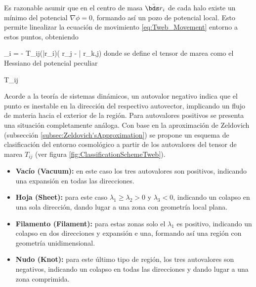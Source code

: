 Es razonable asumir que en el centro de masa $\bar{\bds r}_i$ de cada halo
existe un mínimo del potencial $\nabla \phi = 0$, formando así un pozo de 
potencial local. Esto permite linea\-lizar la ecuación de movimiento 
\ref{eq:Tweb_Movement} entorno a estos puntos, obteniendo


{ _i = - T_{ij}(\bar{\bds r}_i)( r_j - \bar{ r}_{k,j})}
donde se define el tensor de marea como el Hessiano del potencial peculiar


{ T_{ij} \equiv {}}


Acorde a la teoría de sistemas dinámicos, un autovalor negativo indica que
el punto es inestable en la dirección del respectivo autovector, implicando 
un flujo de materia hacia el exterior de la región. Para autovalores 
positivos se presenta una situación completamente análoga. Con base en la 
aproximación de Zeldovich (subsección \ref{subsec:Zeldovich'sApproximation})
se propone un esquema de clasificación del entorno cosmológico a partir de 
los autovalores del tensor de marea $T_{ij}$ 
(ver figura \ref{fig:ClassificationSchemeTweb}).


\begin{itemize}
\item \textbf{Vacío (Vacuum):} en este caso los tres autovalores son positivos, 
indicando una expansión en todas las direcciones.
\item \textbf{Hoja (Sheet):} para este caso $\lambda_1\geq\lambda_2>0$ y 
$\lambda_3<0$, indicando un colapso en una sola dirección, dando lugar a una 
zona con geometría local plana.
\item \textbf{Filamento (Filament):} para estas zonas solo el $\lambda_1$ es
positivo, indicando un colapso en dos direcciones y expansión e una, formando
así una región con geometría unidimensional.
\item \textbf{Nudo (Knot):} para este último tipo de región, los tres 
autovalores son negativos, indicando un colapso en todas las direcciones y 
dando lugar a una zona comprimida.
\end{itemize}


